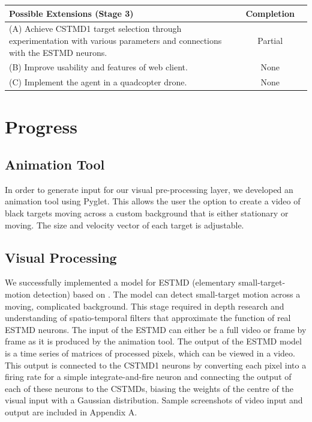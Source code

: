 \documentclass[a4paper,11pt]{article}
\begin{document}
\begin{center}
    \begin{tabular}{p{12cm} c c}
    \textbf{Possible Extensions (Stage 3)} & \textbf{Completion} \\ \hline
	(A) Achieve CSTMD1 target selection through experimentation with various parameters and connections with the ESTMD neurons. & Partial\\
	(B) Improve usability and features of web client. & None\\
	(C) Implement the agent in a quadcopter drone. & None\\
    \end{tabular}
\end{center}


\section{Progress}

\subsection{Animation Tool}
In order to generate input for our visual pre-processing layer, we developed an animation tool using Pyglet. This allows the user the option to create a video of black targets moving across a custom background that is either stationary or moving. The size and velocity vector of each target is adjustable.

\subsection{Visual Processing}
We successfully implemented a model for ESTMD (elementary small-target-motion detection) based on \cite{hal11}. The model can detect small-target motion across a moving, complicated background. This stage required in depth research and understanding of spatio-temporal filters that approximate the function of real ESTMD neurons. The input of the ESTMD can either be a full video or frame by frame as it is produced by the animation tool. The output of the ESTMD model is a time series of matrices of processed pixels, which can be viewed in a video. This output is connected to the CSTMD1 neurons by converting each pixel into a firing rate for a simple integrate-and-fire neuron and connecting the output of each of these neurons to the CSTMDs, biasing the weights of the centre of the visual input with a Gaussian distribution. Sample screenshots of video input and output are included in Appendix A.
\end{document}
